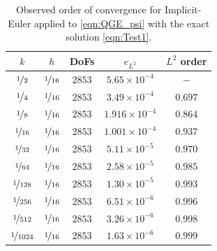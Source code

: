 \begin{table}
  \begin{center}
    \begin{tabular}{|c|c|c|c|c|}
      \hline
      $k$ & $h$ & DoFs & $e_{L^2}$ & $L^2$ order \\%
      \hline
      $\nicefrac{1}{2}$ & $\nicefrac{1}{16}$ & $2853$ & $5.65\times 10^{-4}$ & $-$ \\[0.2em]%
      $\nicefrac{1}{4}$ & $\nicefrac{1}{16}$ & $2853$ & $3.49\times 10^{-4}$ & $0.697$ \\[0.2em]%
      $\nicefrac{1}{8}$ & $\nicefrac{1}{16}$ & $2853$ & $1.916\times 10^{-4}$ & $0.864$ \\[0.2em]%
      $\nicefrac{1}{16}$ & $\nicefrac{1}{16}$ & $2853$ & $1.001\times 10^{-4}$ & $0.937$ \\[0.2em]%
      $\nicefrac{1}{32}$ & $\nicefrac{1}{16}$ & $2853$ & $5.11\times 10^{-5}$ & $0.970$ \\[0.2em]%
      $\nicefrac{1}{64}$ & $\nicefrac{1}{16}$ & $2853$ & $2.58\times 10^{-5}$ & $0.985$ \\[0.2em]%
      $\nicefrac{1}{128}$ & $\nicefrac{1}{16}$ & $2853$ & $1.30\times 10^{-5}$ & $0.993$ \\[0.2em]%
      $\nicefrac{1}{256}$ & $\nicefrac{1}{16}$ & $2853$ & $6.51\times 10^{-6}$ & $0.996$ \\[0.2em]%
      $\nicefrac{1}{512}$ & $\nicefrac{1}{16}$ & $2853$ & $3.26\times 10^{-6}$ & $0.998$ \\[0.2em]%
      $\nicefrac{1}{1024}$ & $\nicefrac{1}{16}$ & $2853$ & $1.63\times 10^{-6}$ & $0.999$ \\[0.2em]%
      \hline

    \end{tabular}
  \end{center}
  \caption{Observed order of convergence for Implicit-Euler applied to
    \eqref{eqn:QGE_psi} with the exact solution \eqref{eqn:Test1}.
  }
  \label{tab:Test1Time}
\end{table}

